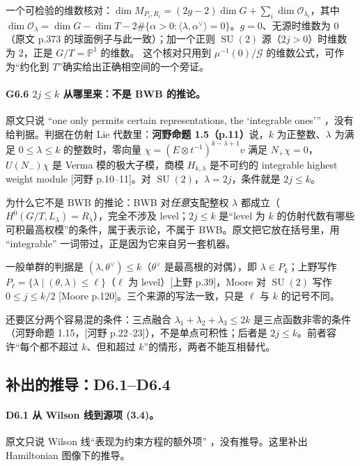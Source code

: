 一个可检验的维数核对：$\dim M_{P_i,R_i}=(2g-2)\dim G+\sum_i\dim\mathcal O_{\lambda_i}$，其中 $\dim\mathcal O_\lambda=\dim G-\dim T-2\#\{\alpha>0:\langle\lambda,\alpha^\vee\rangle=0\}$。$g=0$、无源时维数为 $0$（原文 p.373 的球面例子与此一致）；加一个正则 $\operatorname{SU}(2)$ 源（$2j>0$）时维数为 $2$，正是 $G/T=\mathbb P^1$ 的维数。\ours{} 这个核对只用到 $\mu^{-1}(0)/\mathcal G$ 的维数公式，可作为“约化到 $T$”确实给出正确相空间的一个旁证。

\paragraph{G6.6 $2j\le k$ 从哪里来：不是 BWB 的推论。}原文只说 “one only permits certain representations, the `integrable ones'” ，没有给判据。判据在仿射 Lie 代数里：\textbf{河野命题 1.5（p.11）}说，$k$ 为正整数、$\lambda$ 为满足 $0\le\lambda\le k$ 的整数时，零向量 $\chi=(E\otimes t^{-1})^{k-\lambda+1}v$ 满足 $N_+\chi=0$，$U(N_-)\chi$ 是 Verma 模的极大子模，商模 $H_{k,\lambda}$ 是不可约的 integrable highest weight module [河野 p.10--11]。对 $\operatorname{SU}(2)$，$\lambda=2j$，条件就是 $2j\le k$。

为什么它不是 BWB 的推论：BWB 对\emph{任意}支配整权 $\lambda$ 都成立（$H^0(G/T,L_\lambda)=R_\lambda$），完全不涉及 level；$2j\le k$ 是“level 为 $k$ 的仿射代数有哪些可积最高权模”的条件，属于表示论，不属于 BWB。原文把它放在括号里，用 “integrable” 一词带过，正是因为它来自另一套机器。

一般单群的判据是 $(\lambda,\theta^\vee)\le k$（$\theta^\vee$ 是最高根的对偶），即 $\lambda\in P_k$；上野写作 $P_\ell=\{\lambda\mid(\theta,\lambda)\le\ell\}$（$\ell$ 为 level）[上野 p.39]，Moore 对 $\operatorname{SU}(2)$ 写作 $0\le j\le k/2$ [Moore p.120]。三个来源的写法一致，只是 $\ell$ 与 $k$ 的记号不同。

还要区分两个容易混的条件：三点融合 $\lambda_1+\lambda_2+\lambda_3\le2k$ 是三点函数非零的条件（河野命题 1.15，[河野 p.22--23]），不是单点可积性；后者是 $2j\le k$。前者容许“每个都不超过 $k$、但和超过 $k$”的情形，两者不能互相替代。

\subsection{补出的推导：D6.1--D6.4}
\label{sec:ch6-deriv}

\paragraph{D6.1 从 Wilson 线到源项 (3.4)。}原文只说 Wilson 线“表现为约束方程的额外项” ，没有推导。这里补出 Hamiltonian 图像下的推导。


